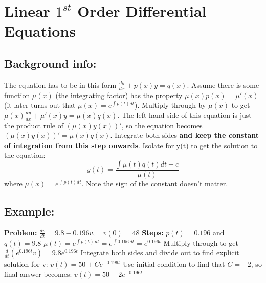 \documentclass{article}
\begin{document}
\hypertarget{linearSolve}{
  \section*{Linear $1^{st}$ Order Differential Equations}
  \subsection*{Background info:} 
  The equation has to be in this form $\frac{dy}{dx} + p(x)y=q(x)$. Assume there is some function $\mu(x)$ (the integrating factor) has the property $\mu(x) p(x)= \mu'(x)$ (it later turns out that $\mu(x) = e^{\int p(t)dt}$). \newline
  Multiply through by $\mu(x)$ to get $\mu(x)\frac{dy}{dx} + \mu'(x)y=\mu(x)q(x)$. The left hand side of this equation is just the product rule of $(\mu(x)y(x))'$, so the equation becomes $(\mu(x)y(x))' = \mu(x)q(x)$. Integrate both sides \textbf{and keep the constant of integration from this step onwards}. \newline
  Isolate for y(t) to get the solution to the equation:
\begin{equation*}
y(t) = \frac{\int \mu(t)q(t) dt - c}{\mu(t)}
\end{equation*}
where $\mu(x) = e^{\int p(t)dt}$. Note the sign of the constant doesn't matter.
  \subsection*{Example:}
  \textbf{Problem:}\newline
  $\frac{dv}{dt} = 9.8 - 0.196v, \quad v(0) = 48$ \newline
  \textbf{Steps:}\newline
  $p(t) = 0.196$ and $q(t) = 9.8$
	$\mu(t) = e^{\int p(t) \, dt} = e^{\int 0.196 \, dt} = e^{0.196t}$\newline
	Multiply through to get $\frac{d}{dt} (e^{0.196t} v) = 9.8e^{0.196t}$\newline
	Integrate both sides and divide out to find explicit solution for v: $v(t) = 50 + Ce^{-0.196t}$ \newline
	Use initial condition to find that $C = -2$, so final answer becomes: $v(t) = 50 - 2e^{-0.196t}$
}
\end{document}
